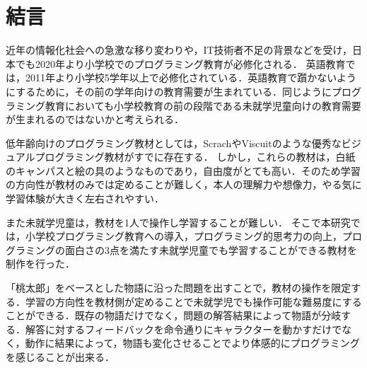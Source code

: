 \newpage

\section{\rm 結言}
近年の情報化社会への急激な移り変わりや，IT技術者不足の背景などを受け，日本でも2020年より小学校でのプログラミング教育が必修化される．
英語教育では，2011年より小学校5学年以上で必修化されている．英語教育で躓かないようにするために，その前の学年向けの教育需要が生まれている．同じようにプログラミング教育においても小学校教育の前の段階である未就学児童向けの教育需要が生まれるのではないかと考えられる．

低年齢向けのプログラミング教材としては，ScrachやViscuitのような優秀なビジュアルプログラミング教材がすでに存在する．
しかし，これらの教材は，白紙のキャンパスと絵の具のようなものであり，自由度がとても高い．そのため学習の方向性が教材のみでは定めることが難しく，本人の理解力や想像力，やる気に学習体験が大きく左右されやすい．

また未就学児童は，教材を1人で操作し学習することが難しい．
そこで本研究では，小学校プログラミング教育への導入，プログラミング的思考力の向上，プログラミングの面白さの3点を満たす未就学児童でも学習することができる教材を制作を行った．

「桃太郎」をベースとした物語に沿った問題を出すことで，教材の操作を限定する．学習の方向性を教材側が定めることで未就学児でも操作可能な難易度にすることができる．既存の物語だけでなく，問題の解答結果によって物語が分岐する．解答に対するフィードバックを命令通りにキャラクターを動かすだけでなく，動作に結果によって，物語も変化させることでより体感的にプログラミングを感じることが出来る．
